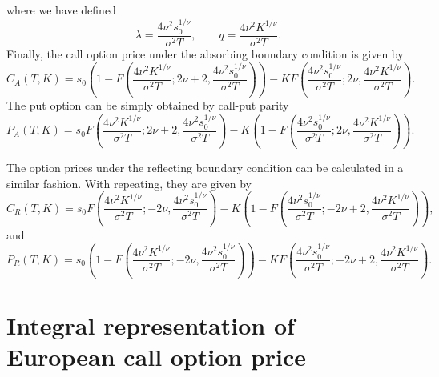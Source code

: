 \documentclass[12pt]{article}
\begin{document}
  where we have defined
  \begin{equation}
    \lambda = \frac{4\nu^2s_0^{1/\nu}}{\sigma^2T}, \quad\quad q = \frac{4\nu^2K^{1/\nu}}{\sigma^2T}.
  \end{equation}
  Finally, the call option price under the absorbing boundary condition is given by
  \begin{equation}
    C_A(T,K)=s_0\left(1 - F\left(\frac{4\nu^2K^{1/\nu}}{\sigma^2T};2\nu+2,\frac{4\nu^2s_0^{1/\nu}}{\sigma^2T}\right)\right)
             - KF\left(\frac{4\nu^2s_0^{1/\nu}}{\sigma^2T};2\nu,\frac{4\nu^2K^{1/\nu}}{\sigma^2T}\right).
  \end{equation}
  The put option can be simply obtained by call-put parity
  \begin{equation}
    P_A(T,K)=s_0F\left(\frac{4\nu^2K^{1/\nu}}{\sigma^2T};2\nu+2,\frac{4\nu^2s_0^{1/\nu}}{\sigma^2T}\right)
             - K\left(1-F\left(\frac{4\nu^2s_0^{1/\nu}}{\sigma^2T};2\nu,\frac{4\nu^2K^{1/\nu}}{\sigma^2T}\right)\right).
  \end{equation}

  The option prices under the reflecting boundary condition can be calculated in a similar fashion. With repeating, they are given by
  \begin{equation}
    C_R(T,K)=s_0F\left(\frac{4\nu^2K^{1/\nu}}{\sigma^2T};-2\nu,\frac{4\nu^2s_0^{1/\nu}}{\sigma^2T}\right)
             - K\left(1-F\left(\frac{4\nu^2s_0^{1/\nu}}{\sigma^2T};-2\nu+2,\frac{4\nu^2K^{1/\nu}}{\sigma^2T}\right)\right),
  \end{equation}
  and
  \begin{equation}
    P_R(T,K)=s_0\left(1 - F\left(\frac{4\nu^2K^{1/\nu}}{\sigma^2T};-2\nu,\frac{4\nu^2s_0^{1/\nu}}{\sigma^2T}\right)\right)
             - KF\left(\frac{4\nu^2s_0^{1/\nu}}{\sigma^2T};-2\nu+2,\frac{4\nu^2K^{1/\nu}}{\sigma^2T}\right).
  \end{equation}


\section{Integral representation of European call option price}
\end{document}

